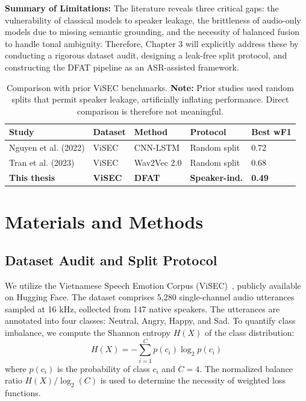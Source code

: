 \documentclass[12pt,a4paper]{report}
\begin{document}
\vspace{0.5cm}
\noindent \textbf{Summary of Limitations:} The literature reveals three critical gaps: the vulnerability of classical models to speaker leakage, the brittleness of audio-only models due to missing semantic grounding, and the necessity of balanced fusion to handle tonal ambiguity. Therefore, Chapter 3 will explicitly address these by conducting a rigorous dataset audit, designing a leak-free split protocol, and constructing the DFAT pipeline as an ASR-assisted framework.

\begin{table}[h]
\centering
\small
\begin{tabular}{p{3cm}p{2cm}p{2.5cm}p{2.5cm}p{3cm}}
\toprule
\textbf{Study} & \textbf{Dataset} & \textbf{Method} & \textbf{Protocol} & \textbf{Best wF1} \\
\midrule
Nguyen et al. (2022) & ViSEC & CNN-LSTM & Random split & 0.72 \\
Tran et al. (2023) & ViSEC & Wav2Vec 2.0 & Random split & 0.68 \\
\textbf{This thesis} & \textbf{ViSEC} & \textbf{DFAT} & \textbf{Speaker-ind.} & \textbf{0.49} \\
\bottomrule
\end{tabular}
\caption{Comparison with prior ViSEC benchmarks. \textbf{Note:} Prior studies used 
random splits that permit speaker leakage, artificially inflating performance. 
Direct comparison is therefore not meaningful.}
\label{tab:prior_work}
\end{table}


\chapter{Materials and Methods}

\section{Dataset Audit and Split Protocol}
We utilize the Vietnamese Speech Emotion Corpus (ViSEC)~\cite{visec}, publicly available on Hugging Face. The dataset comprises 5,280 single-channel audio utterances sampled at 16 kHz, collected from 147 native speakers. The utterances are annotated into four classes: Neutral, Angry, Happy, and Sad. To quantify class imbalance, we compute the Shannon entropy $H(X)$ of the class distribution:
\begin{equation}
    H(X) = - \sum_{i=1}^{C} p(c_i) \log_2 p(c_i)
\end{equation}
where $p(c_i)$ is the probability of class $c_i$ and $C=4$. The normalized balance ratio $H(X) / \log_2(C)$ is used to determine the necessity of weighted loss functions.
\end{document}
